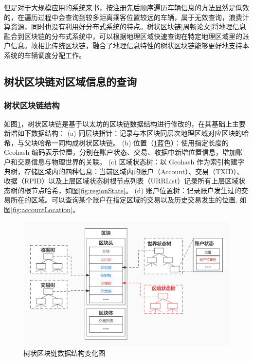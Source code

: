 但是对于大规模应用的系统来书，按注册先后顺序遍历车辆信息的方法显然是低效的，在遍历过程中会查询到较多距离乘客位置较远的车辆，属于无效查询，浪费计算资源，同时也没有利用好分布式系统的特点。树状区块链[周畅论文]将地理信息融合到区块链的分布式系统中，可以根据地理区域快速查询在特定地理区域里的账户信息。故相比传统区块链，融合了地理信息特性的树状区块链能够更好地支持本系统的车辆调度分配工作。

\subsection{树状区块链对区域信息的查询}
\subsubsection{树状区块链结构}
如图\ref{fig:treeBlockchain}，树状区块链是基于以太坊的区块链数据结构进行修改的，在其基础上主要新增如下数据结构：
(a) 同层块指针：记录与本区块同层次地理区域对应区块的哈希，与父块哈希一同构成树状区块链。
(b) 位置（\ref{fig:treeBlockchain}蓝色）：使用指定长度的 Geohash 编码表示位置，分别在账户状态、交易、收据中新增位置信息，增加账户和交易信息与物理世界的关联。
(c) 区域状态树：以 Geohash 作为索引构建字典树，存储区域内的四种信息：当前区域内的账户（Account）、交易（TXID）、收据（RPID）以及上层区域状态树根节点列表（URRList）记录所有上层区域状态树的根节点哈希，如图\ref{fig:regionState}。
(d) 账户位置树：记录账户发生过的交易所在的区域。可以查询某个账户在指定区域的交易以及历史交易发生的位置, 如图\ref{fig:accountLocation}。

\begin{figure}
  \centering
  \includegraphics[width=1.0\textwidth]{figures/树状区块链}
  \caption{树状区块链数据结构变化图}\label{fig:treeBlockchain}
\end{figure}


